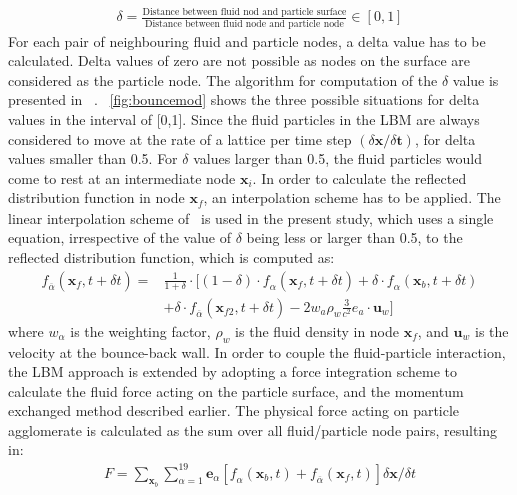 \begin{align}
\delta = \frac{\mbox{Distance between fluid nod and particle surface}}{\mbox{Distance between fluid node and particle node}} \in [0,1]
\end{align} 
For each pair of neighbouring fluid and particle nodes, a delta value has to be calculated. Delta values of zero are not possible as nodes on the surface are considered as the particle node. The algorithm for computation of the $\delta$ value is presented in ~\citet{Iglberger2008}. ~\cref{fig:bouncemod} shows the three possible situations for delta values in the interval of [0,1]. Since the fluid particles in the LBM are always considered to move at the rate of a lattice per time step $(\delta \mathbf{x}/ \delta \mathbf{t})$, for delta values smaller than 0.5. For $\delta$ values larger than 0.5, the fluid particles would come to rest at an intermediate node $\mathbf{x}_{\mathit{i}}$. In order to calculate the reflected distribution function in node $\mathbf{x}_{\mathit{f}}$, an interpolation scheme has to be applied. The linear interpolation scheme of~\citet{Yu2003a, Yu2003} is used in the present study, which uses a single equation, irrespective of the value of $\delta$ being less or larger than 0.5, to the reflected distribution function, which is computed as:
\begin{align}
 \nonumber
\mathit{\mathit{f}}_{\overline{\alpha}}(\mathbf{x}_{\mathit{f}},t + \delta t) = & \frac{1}{1 + \delta} \cdot [(1-\delta)\cdot \mathit{\mathit{f}}_{\alpha}(\mathbf{x}_{\mathit{f}},t + \delta t) + \delta \cdot \mathit{\mathit{f}}_{\alpha}(\mathbf{x}_{\mathit{b}},t + \delta t)  \\
& + \delta \cdot \mathit{\mathit{f}}_{\overline{\alpha}}(\mathbf{x}_{\mathit{f2}},t + \delta t) -2\mathit{w}_{\mathit{a}}\rho_{\mathit{w}}\frac{3}{\mathit{c}^{2}}\mathbf{\mathit{e}}_{\mathit{a}}\cdot \mathbf{u}_{\mathit{w}}]
\end{align}
where $\mathit{w}_{\alpha}$ is the weighting factor, $\rho_{\mathit{w}}$ is the fluid density in node $\mathbf{x}_{\mathit{f}}$, and $ \mathbf{u}_{\mathit{w}}  $ is the velocity at the bounce-back wall. In order to couple the fluid-particle interaction, the LBM approach is extended by adopting a force integration scheme to calculate the fluid force acting on the particle surface, and the momentum exchanged method described earlier. The physical force acting on particle agglomerate is calculated as the sum over all fluid/particle node pairs, resulting in: 
\begin{align}
\mathit{F} = \sum\limits_{\mathbf{x}_{b}}\sum\limits_{\alpha=1}^{19}{\mathbf{e}_{\alpha}[\mathit{f}_{\alpha}(\mathbf{x}_{b},t)+\mathit{f}_{\overline{\alpha}}(\mathbf{x}_{f},t)] \delta \mathbf{x} / \delta t}
\end{align}
